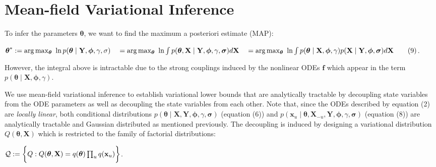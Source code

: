 \section{Mean-field Variational Inference}

\begin{par}
To infer the parameters $\boldsymbol{\theta}$, we want to find the maximum a posteriori estimate (MAP):
\end{par} \vspace{1em}
\begin{par}
$\boldsymbol{\theta}^* := \mathrm{arg} \max_{\boldsymbol{\theta}} ~ \ln p(\boldsymbol{\theta} \mid\mathbf{Y},\boldsymbol{\phi},\gamma,\mathbf \sigma)\\ \quad= \mathrm{arg}\max_{\boldsymbol{\theta}} ~ \ln \int  p(\boldsymbol{\theta},\mathbf{X} \mid\mathbf{Y},\boldsymbol{\phi},\gamma,\boldsymbol\sigma) d\mathbf{X}\\ \quad= \mathrm{arg}\max_{\boldsymbol{\theta}} ~ \ln \int p(\boldsymbol{\theta} \mid \mathbf{X},\boldsymbol{\phi},\gamma)p(\mathbf{X} \mid \mathbf{Y}, \boldsymbol{\phi},\boldsymbol\sigma) d\mathbf{X} \qquad(9)$.
\end{par} \vspace{1em}
\begin{par}
However, the integral above is intractable due to the strong couplings induced by the nonlinear ODEs $\mathbf{f}$ which appear in the term $p(\boldsymbol{\theta} \mid \mathbf{X},\boldsymbol{\phi},\gamma)$.
\end{par} \vspace{1em}
\begin{par}
We use mean-field variational inference to establish variational lower bounds that are analytically tractable by decoupling state variables from the ODE parameters as well as decoupling the state variables from each other. Note that, since the ODEs described by equation (2) are \textit{locally linear}, both conditional distributions $p(\boldsymbol{\theta} \mid\mathbf{X},\mathbf{Y},\boldsymbol{\phi},\gamma,\boldsymbol\sigma)$ (equation (6)) and $p(\mathbf{x}_u \mid \boldsymbol{\theta},\mathbf{X}_{-u},\mathbf{Y},\boldsymbol{\phi},\gamma,\boldsymbol\sigma)$ (equation (8)) are analytically tractable and Gaussian distributed as mentioned previously. The decoupling is induced by designing a variational distribution $Q(\boldsymbol{\theta},\mathbf{X})$ which is restricted to the family of factorial distributions:
\end{par} \vspace{1em}
\begin{par}
$\mathcal{Q} := \bigg{\{} Q : Q(\boldsymbol{\theta},\mathbf{X}) = q(\boldsymbol{\theta}) \prod_uq(\mathbf{x}_u) \bigg{\}}$.
\end{par} \vspace{1em}
